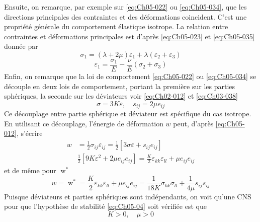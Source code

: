 Ensuite, on remarque, par exemple sur \eqref{eq:Ch05-022} ou \eqref{eq:Ch05-034}, que les directions principales des contraintes et des déformations coincident.
C'est une propriété générale du comportement élastique isotrope.
La relation entre contraintes et déformations principales est d'après \eqref{eq:Ch05-023} et \eqref{eq:Ch05-035} donnée par 
\begin{equation}
    \sigma_1 = \left( \lambda + 2 \mu \right) \varepsilon_1 + \lambda \left( \varepsilon_2 + \varepsilon_3 \right)
    \label{eq:Ch05-037}
\end{equation}
\begin{equation}
    \varepsilon_1 = \frac{\sigma_1}{E} - \frac{\nu}{E} \left( \sigma_2 + \sigma_3 \right)
    \label{eq:Ch05-038}
\end{equation}
Enfin, on remarque que la loi de comportement \eqref{eq:Ch05-022} ou \eqref{eq:Ch05-034} se découple en deux lois de comportement, portant la première sur les parties sphériques, la seconde sur les déviateurs voir \eqref{eq:Ch02-012} et \eqref{eq:Ch03-038}
\begin{equation}
    \sigma = 3 K \varepsilon , \quad s_{ij} = 2 \mu e_{ij}
    \label{eq:Ch05-039}
\end{equation}
Ce découplage entre partie sphérique et déviateur est spécifique du cas isotrope.
En utilisant ce découplage, l'énergie de déformation $w$ peut, d'après \eqref{eq:Ch05-012}, s'écrire 
\begin{equation*}
    \begin{split}
        w &= \frac{1}{2} \sigma_{ij} \varepsilon_{ij} = \frac{1}{2} \left[ 3 \sigma \varepsilon + s_{ij} e_{ij} \right] \\
        & \frac{1}{2} \left[ 9 K \varepsilon^2 + 2\mu e_{ij} e_{ij} \right] = \frac{K}{2} \varepsilon_{kk} \varepsilon_{ll} + \mu e_{ij} e_{ij}
    \end{split}
\end{equation*}
et de même pour $\mathop{w}^*$
\begin{equation}
    w=\mathop{w}^* = \frac{K}{2} \varepsilon_{kk} \varepsilon_{ll} + \mu e_{ij} e_{ij} = \frac{1}{18K} \sigma_{kk} \sigma_{ll} + \frac{1}{4\mu} s_{ij} s_{ij}
    \label{eq:Ch05-049}
\end{equation}
Puisque déviateurs et parties sphériques sont indépendants, on voit qu'une CNS pour que l'hypothèse de stabilité \eqref{eq:Ch05-04} soit vérifiée est que 
\begin{equation}
    K>0, \quad \mu >0
    \label{eq:Ch05-050}
\end{equation}
